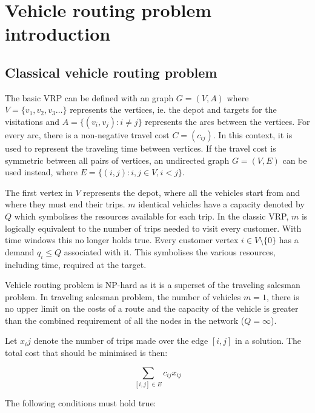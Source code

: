 \chapter{Vehicle routing problem introduction}
\label{chapter:background} 

\section{Classical vehicle routing problem}



The basic VRP can be defined with an graph $G = (V, A)$ where $V = \{v_1, v_2, v_3\dots\}$ represents the vertices, ie. the depot and targets for the visitations and $A = \{(v_i, v_j): i \neq j \}$ represents the arcs between the vertices. For every arc, there is a non-negative travel cost $C=(c_{ij})$. In this context, it is used to represent the traveling time between vertices. If the travel cost is symmetric between all pairs of vertices, an undirected graph $G = (V, E)$ can be used instead, where $E=\{(i, j) : i, j \in V, i < j\}$. \cite{laporte2007you}

The first vertex in $V$ represents the depot, where all the vehicles start from and where they must end their trips. $m$ identical vehicles have a capacity denoted by $Q$ which symbolises the resources available for each trip. In the classic VRP, $m$ is logically equivalent to the number of trips needed to visit every customer. With time windows this no longer holds true. Every customer vertex $i \in V\setminus\{0\}$ has a demand $q_i \leq Q$ associated with it. This symbolises the various resources, including time, required at the target. \cite{laporte2007you}

Vehicle routing problem is NP-hard as it is a superset of the traveling salesman problem. In traveling salesman problem, the number of vehicles $m = 1$, there is no upper limit on the costs of a route and the capacity of the vehicle is greater than the combined requirement of all the nodes in the network ($Q = \infty$). \cite{laporte2007you} 

Let $x_ij$ denote the number of trips made over the edge $[i, j]$ in a solution. The total cost that should be minimised is then:

\begin{equation}
\label{eq:baseformula1}
\displaystyle \sum_{[i,j] \in E} c_{ij}x_{ij}
\end{equation}

\noindent
The following conditions must hold true:

